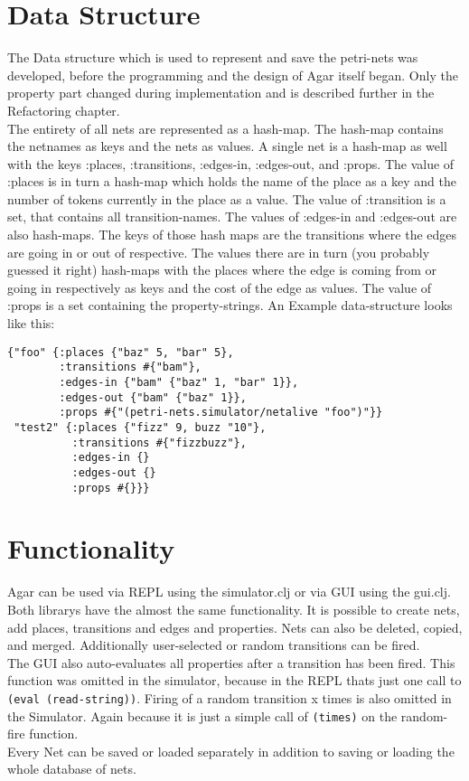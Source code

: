 \documentclass[twoside]{article}
\begin{document}
\begin{multicols}{2}
\section{Data Structure}
The Data structure which is used to represent and save the petri-nets was developed, before the programming and
the design of Agar itself began. Only the property part changed during implementation and is described further
in the Refactoring chapter.\\
The entirety of all nets are represented as a hash-map. The hash-map contains the netnames as keys and the nets as values.
A single net is a hash-map as well with the keys :places, :transitions, :edges-in, :edges-out, and :props.
The value of :places is in turn a hash-map which holds the name of the place as a key and the number of tokens currently
in the place as a value.
The value of :transition is a set, that contains all transition-names. 
The values of :edges-in and :edges-out are also hash-maps. The keys of those hash maps are the transitions where the edges are going in or
out of respective. The values there are in turn (you probably guessed it right) hash-maps with the places where
the edge is coming from or going in respectively as keys and the cost of the edge as values.
The value of :props is a set containing the property-strings.
An Example data-structure looks like this:
\begin{verbatim}
{"foo" {:places {"baz" 5, "bar" 5}, 
		:transitions #{"bam"}, 
		:edges-in {"bam" {"baz" 1, "bar" 1}}, 
		:edges-out {"bam" {"baz" 1}}, 
		:props #{"(petri-nets.simulator/netalive "foo")"}}
 "test2" {:places {"fizz" 9, buzz "10"},
 		  :transitions #{"fizzbuzz"},
 		  :edges-in {}
 		  :edges-out {}
 		  :props #{}}}
\end{verbatim}


\section{Functionality}
Agar can be used via REPL using the simulator.clj or via GUI using the gui.clj.
Both librarys have the almost the same functionality.
It is possible to create nets, add places, transitions and edges and properties. Nets can also be 
deleted, copied, and merged. 
Additionally user-selected or random transitions can be fired.\\ 
The GUI also auto-evaluates all properties after a transition has been fired. This function was omitted in
the simulator, because in the REPL thats just one call to \texttt{(eval (read-string))}.
Firing of a random transition x times is also omitted in the Simulator. Again because it is just a simple
call of \texttt{(times)} on the random-fire function.\\
Every Net can be saved or loaded separately in addition to saving or loading the whole database of nets.


\end{multicols}
\end{document}
